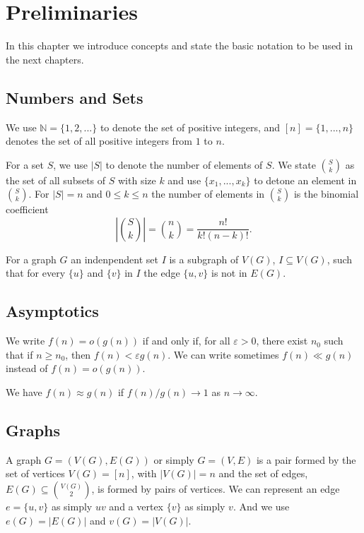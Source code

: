 \documentclass[12pt,twoside,a4paper,bibliography=totocnumbered]{book}
\numberwithin{equation}{section}
\theoremstyle{remark}
\begin{document}

\chapter{Preliminaries}
In this chapter we introduce concepts and state the basic notation to be used in the next chapters.

\section{Numbers and Sets}
We use $\mathbb{N} = \{1,2,...\}$ to denote the set of positive integers, and $[n]=\{1,...,n\}$ denotes the set of all positive integers from $1$ to $n$. 

For a set $S$, we use $|S|$ to denote the number of elements of $S$. We state $\binom{S}{k}$ as the set of all subsets of $S$ with size $k$ and use $\{x_1,...,x_k\}$ to detone an element in $\binom{S}{k}$. For $|S| = n$ and $0 \leq k \leq n$ the number of elements in $\binom{S}{k}$ is the binomial coefficient
$$ \left| \binom{S}{k} \right| = \binom{n}{k} = \frac{n!}{k!(n-k)!}.$$

For a graph $G$ an indenpendent set $I$ is a subgraph of $V(G)$, $I \subseteq V(G)$, such that for every $\{u\}$ and $\{v\}$ in $I$ the edge $\{u,v\}$ is not in $E(G)$.
 
\section{Asymptotics}
We write $f(n) = o(g(n))$ if and only if, for all $\varepsilon > 0$, there exist $n_0$ such that if $n \geq n_0$, then $f(n) < \varepsilon g(n)$. We can write sometimes $f(n) \ll g(n)$ instead of $f(n) = o(g(n))$.

We have $f(n) \approx g(n)$ if $f(n)/g(n) \rightarrow 1$ as $n \rightarrow \infty$.

\section{Graphs}
A graph $G = (V(G), E(G))$ or simply $G = (V, E)$ is a pair formed by the set of vertices $V(G) = [n]$, with $|V(G)|=n$ and the set of edges, $E(G) \subseteq \binom{V(G)}{2}$, is formed by pairs of vertices. We can represent an edge $e = \{u,v\}$ as simply $uv$ and a vertex $\{v\}$ as simply $v$. And we use $e(G) = |E(G)|$ and $v(G) = |V(G)|$.
\end{document}
